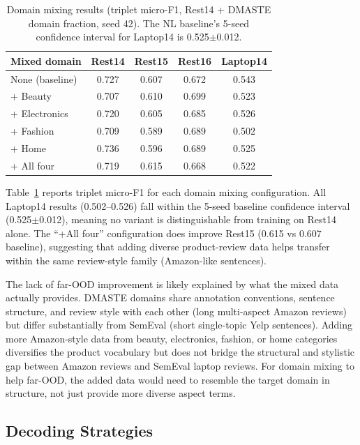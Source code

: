 \documentclass[12pt,a4paper]{report}
\begin{document}
\begin{table}[H]
\centering
\caption{Domain mixing results (triplet micro-F1, Rest14 + DMASTE domain fraction, seed 42). The NL baseline's 5-seed confidence interval for Laptop14 is 0.525$\pm$0.012.}
\label{tab:domainmix}
\small
\begin{tabular}{@{}lcccc@{}}
\toprule
\textbf{Mixed domain} & \textbf{Rest14} & \textbf{Rest15} & \textbf{Rest16} & \textbf{Laptop14} \\
\midrule
None (baseline) & 0.727 & 0.607 & 0.672 & 0.543 \\
\midrule
+ Beauty & 0.707 & 0.610 & 0.699 & 0.523 \\
+ Electronics & 0.720 & 0.605 & 0.685 & 0.526 \\
+ Fashion & 0.709 & 0.589 & 0.689 & 0.502 \\
+ Home & 0.736 & 0.596 & 0.689 & 0.525 \\
+ All four & 0.719 & 0.615 & 0.668 & 0.522 \\
\bottomrule
\end{tabular}
\end{table}

Table~\ref{tab:domainmix} reports triplet micro-F1 for each domain mixing configuration. All Laptop14 results (0.502--0.526) fall within the 5-seed baseline confidence interval (0.525$\pm$0.012), meaning no variant is distinguishable from training on Rest14 alone. The ``+All four'' configuration does improve Rest15 (0.615 vs 0.607 baseline), suggesting that adding diverse product-review data helps transfer within the same review-style family (Amazon-like sentences).

The lack of far-OOD improvement is likely explained by what the mixed data actually provides. DMASTE domains share annotation conventions, sentence structure, and review style with each other (long multi-aspect Amazon reviews) but differ substantially from SemEval (short single-topic Yelp sentences). Adding more Amazon-style data from beauty, electronics, fashion, or home categories diversifies the product vocabulary but does not bridge the structural and stylistic gap between Amazon reviews and SemEval laptop reviews. For domain mixing to help far-OOD, the added data would need to resemble the target domain in structure, not just provide more diverse aspect terms.

\subsection{Decoding Strategies}\label{sec:decoding}
\end{document}
